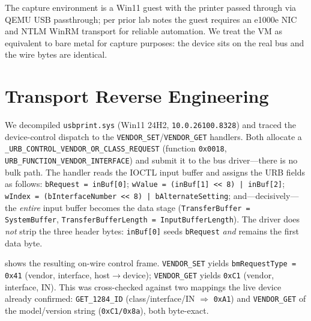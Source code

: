 \documentclass[conference]{IEEEtran}
\begin{document}
The capture environment is a Win11 guest with the printer passed through
via QEMU USB passthrough; per prior lab notes the guest requires an
e1000e NIC and NTLM WinRM transport for reliable automation. We treat the
VM as equivalent to bare metal for capture purposes: the device sits on the
real bus and the wire bytes are identical.

\section{Transport Reverse Engineering}
\label{sec:transport}

We decompiled \texttt{usbprint.sys} (Win11 24H2,
\texttt{10.0.26100.8328}) and traced the device-control dispatch to the
\texttt{VENDOR\_SET}/\texttt{VENDOR\_GET} handlers. Both allocate a
\texttt{\_URB\_CONTROL\_VENDOR\_OR\_CLASS\_REQUEST} (function
\texttt{0x0018}, \texttt{URB\_FUNCTION\_VENDOR\_INTERFACE}) and submit it
to the bus driver---there is no bulk path. The handler reads the IOCTL
input buffer and assigns the URB fields as follows: \texttt{bRequest =
inBuf[0]}; \texttt{wValue = (inBuf[1] << 8) | inBuf[2]}; \texttt{wIndex =
(bInterfaceNumber << 8) | bAlternateSetting}; and---decisively---the
\emph{entire} input buffer becomes the data stage
(\texttt{TransferBuffer = SystemBuffer}, \texttt{TransferBufferLength =
InputBufferLength}). The driver does \emph{not} strip the three header
bytes: \texttt{inBuf[0]} seeds \texttt{bRequest} \emph{and} remains the
first data byte.

 shows the resulting on-wire control frame.
\texttt{VENDOR\_SET} yields \texttt{bmRequestType = 0x41} (vendor,
interface, host$\rightarrow$device); \texttt{VENDOR\_GET} yields
\texttt{0xC1} (vendor, interface, IN). This was cross-checked against two
mappings the live device already confirmed: \texttt{GET\_1284\_ID}
(class/interface/IN $\Rightarrow$ \texttt{0xA1}) and \texttt{VENDOR\_GET}
of the model/version string (\texttt{0xC1/0x8a}), both byte-exact.
\end{document}
